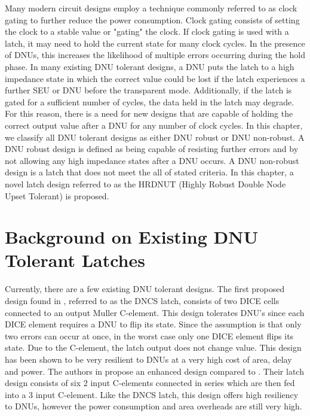 Many modern circuit designs employ a technique commonly referred to as clock gating to further reduce the power consumption. Clock gating consists of setting the clock to a stable value or "gating" the clock. If clock gating is used with a latch, it may need to hold the current state for many clock cycles. In the presence of DNUs, this increases the likelihood of multiple errors occurring during the hold phase. In many existing DNU tolerant designs, a DNU puts the latch to a high impedance state in which the correct value could be lost if the latch experiences a further SEU or DNU before the transparent mode. Additionally, if the latch is gated for a sufficient number of cycles, the data held in the latch may degrade. For this reason, there is a need for new designs that are capable of holding the correct output value after a DNU for any number of clock cycles. In this chapter, we classify all DNU tolerant designs as either DNU robust or DNU non-robust. A DNU robust design is defined as being capable of resisting further errors and by not allowing any high impedance states after a DNU occurs. A DNU non-robust design is a latch that does not meet the all of stated criteria. In this chapter, a novel latch design referred to as the HRDNUT (Highly Robust Double Node Upset Tolerant) is proposed.

\section{Background on Existing DNU Tolerant Latches} \label{sec:DNUex}

Currently, there are a few existing DNU tolerant designs. The first proposed design found in \cite{DNCS}, referred to as the DNCS latch, consists of two DICE cells connected to an output Muller C-element. This design tolerates DNU's since each DICE element requires a DNU to flip its state. Since the assumption is that only two errors can occur at once, in the worst case only one DICE element flips its state. Due to the C-element, the latch output does not change value. This design has been shown to be very resilient to DNUs at a very high cost of area, delay and power. The authors in \cite{Inter} propose an enhanced design compared to \cite{DNCS}. Their latch design consists of six 2 input C-elements connected in series which are then fed into a 3 input C-element. Like the DNCS latch, this design offers high resiliency to DNUs, however the power consumption and area overheads are still very high. 

